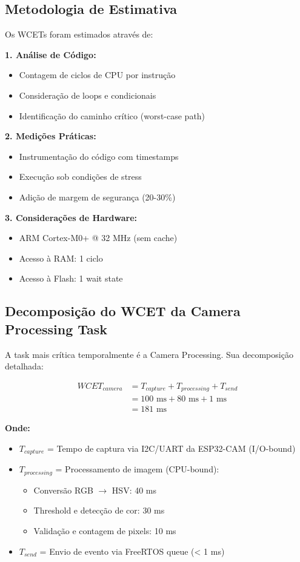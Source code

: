 \documentclass[12pt,a4paper]{article}
\begin{document}
\subsection{Metodologia de Estimativa}

Os WCETs foram estimados através de:

\textbf{1. Análise de Código:}
\begin{itemize}
    \item Contagem de ciclos de CPU por instrução
    \item Consideração de loops e condicionais
    \item Identificação do caminho crítico (worst-case path)
\end{itemize}

\textbf{2. Medições Práticas:}
\begin{itemize}
    \item Instrumentação do código com timestamps
    \item Execução sob condições de stress
    \item Adição de margem de segurança (20-30\%)
\end{itemize}

\textbf{3. Considerações de Hardware:}
\begin{itemize}
    \item ARM Cortex-M0+ @ 32 MHz (sem cache)
    \item Acesso à RAM: 1 ciclo
    \item Acesso à Flash: 1 wait state
\end{itemize}

\subsection{Decomposição do WCET da Camera Processing Task}

A task mais crítica temporalmente é a Camera Processing. Sua decomposição detalhada:

\begin{align}
WCET_{camera} &= T_{capture} + T_{processing} + T_{send} \\
&= 100 \text{ ms} + 80 \text{ ms} + 1 \text{ ms} \\
&= 181 \text{ ms}
\end{align}

\textbf{Onde:}
\begin{itemize}
    \item $T_{capture}$ = Tempo de captura via I2C/UART da ESP32-CAM (I/O-bound)
    \item $T_{processing}$ = Processamento de imagem (CPU-bound):
    \begin{itemize}
        \item Conversão RGB $\rightarrow$ HSV: 40 ms
        \item Threshold e detecção de cor: 30 ms
        \item Validação e contagem de pixels: 10 ms
    \end{itemize}
    \item $T_{send}$ = Envio de evento via FreeRTOS queue (< 1 ms)
\end{itemize}
\end{document}

